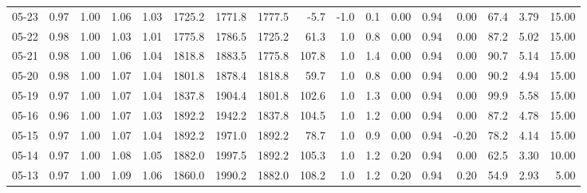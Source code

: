 \begin{threeparttable}
{\begin{tabular}{lrrrrrrrrrrrrrrrr}
  05-23 &         0.97 &           1.00 &          1.06 &          1.03 & 1725.2 & 1771.8 & 1777.5 &       -5.7 &                     -1.0 &                 0.1 &       0.00 &      0.94 &           0.00 &             67.4 &            3.79 &                  15.00 \\
  05-22 &         0.98 &           1.00 &          1.03 &          1.01 & 1775.8 & 1786.5 & 1725.2 &       61.3 &                      1.0 &                 0.8 &       0.00 &      0.94 &           0.00 &             87.2 &            5.02 &                  15.00 \\
  05-21 &         0.98 &           1.00 &          1.06 &          1.04 & 1818.8 & 1883.5 & 1775.8 &      107.8 &                      1.0 &                 1.4 &       0.00 &      0.94 &           0.00 &             90.7 &            5.14 &                  15.00 \\
  05-20 &         0.98 &           1.00 &          1.07 &          1.04 & 1801.8 & 1878.4 & 1818.8 &       59.7 &                      1.0 &                 0.8 &       0.00 &      0.94 &           0.00 &             90.2 &            4.94 &                  15.00 \\
  05-19 &         0.97 &           1.00 &          1.07 &          1.04 & 1837.8 & 1904.4 & 1801.8 &      102.6 &                      1.0 &                 1.3 &       0.00 &      0.94 &           0.00 &             99.9 &            5.58 &                  15.00 \\
  05-16 &         0.96 &           1.00 &          1.07 &          1.03 & 1892.2 & 1942.2 & 1837.8 &      104.5 &                      1.0 &                 1.2 &       0.00 &      0.94 &           0.00 &             87.2 &            4.78 &                  15.00 \\
  05-15 &         0.97 &           1.00 &          1.07 &          1.04 & 1892.2 & 1971.0 & 1892.2 &       78.7 &                      1.0 &                 0.9 &       0.00 &      0.94 &          -0.20 &             78.2 &            4.14 &                  15.00 \\
  05-14 &         0.97 &           1.00 &          1.08 &          1.05 & 1882.0 & 1997.5 & 1892.2 &      105.3 &                      1.0 &                 1.2 &       0.20 &      0.94 &           0.00 &             62.5 &            3.30 &                  10.00 \\
  05-13 &         0.97 &           1.00 &          1.09 &          1.06 & 1860.0 & 1990.2 & 1882.0 &      108.2 &                      1.0 &                 1.2 &       0.20 &      0.94 &           0.20 &             54.9 &            2.93 &                   5.00 \\

\end{tabular}}
\end{threeparttable}
